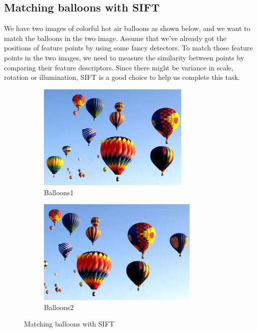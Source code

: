 \subsection{Matching balloons with SIFT}
We have two images of colorful hot air balloons as shown below, and we want to match the balloons in the two image.
Assume that we've already got the positions of feature points by using some fancy detectors.
To match those feature points in the two images, we need to measure the similarity between points by comparing their feature descriptors.
Since there might be variance in scale, rotation or illumination, SIFT is a good choice to help us complete this task.
\begin{figure}[htbp]
	\centering
	\begin{subfigure}[t]{0.4\textwidth}
	    \centering
		\includegraphics[width=0.8\textwidth]{hw3/problem2/balloons1.jpg}
		\caption{Balloons1}\label{fig:11a}
	\end{subfigure}
	\qquad
	\begin{subfigure}[t]{0.4\textwidth}
	    \centering
		\includegraphics[width=0.85\textwidth]{hw3/problem2/balloons2.jpg}
		\caption{Balloons2}\label{fig:11b}
	\end{subfigure}
	\caption{Matching balloons with SIFT}\label{fig:11}
\end{figure}

